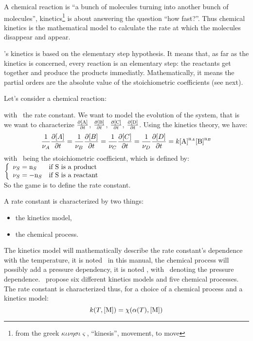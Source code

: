 A chemical reaction is ``a bunch of molecules
turning into another bunch of molecules'', kinetics\footnote{%
from the greek $\kappa\iota\nu\eta\sigma\iota\varsigma$, ``kinesis'', movement, to move}
is about answering the question ``how fast?''.
Thus chemical kinetics is the mathematical model
to calculate the rate at which the molecules disappear and
appear.

\antioch's kinetics is based on the elementary step
hypothesis. It means that, as far as the kinetics is
concerned, every reaction is an elementary step:
the reactants get together and produce the products
immediatly. Mathematically, it means
the partial orders are the absolute
value of the stoichiometric coefficients (see next).

Let's consider a chemical reaction:
\begin{chemicalEquation}
\label{genericX}
\end{chemicalEquation}
with \rcons\ the rate constant.
We want to model the evolution of the system, that is we want to
characterize 
$\doverdt{\conc[A]}$,
$\doverdt{\conc[B]}$,
$\doverdt{\conc[C]}$,
$\doverdt{\conc[D]}$.
Using the kinetics theory, we have:
\begin{equation}
\frac{1}{\scoef[A]}\doverdt{[A]} = 
\frac{1}{\scoef[B]}\doverdt{[B]} = 
\frac{1}{\scoef[C]}\doverdt{[C]} = 
\frac{1}{\scoef[D]}\doverdt{[D]} = 
\rcons\conc[A]^{\scoefabs[A]}\conc[B]^{\scoefabs[B]}
\end{equation}
with \scoef[A]\ being the stoichiometric coefficient, which is defined by:\\[5pt]
$\left\{\begin{array}{ll}
\scoef[S] = \scoefabs[S] & \text{if \ce{S} is a product} \\
\scoef[S] = -\scoefabs[S] & \text{if \ce{S} is a reactant} \\
\end{array}\right.$\\[5pt]
So the game is to define the rate constant. 

A rate constant is characterized by two things:
\begin{itemize}
\item the kinetics model,
\item the chemical process.
\end{itemize}
The kinetics model will mathematically describe the rate constant's dependence with
the temperature, it is noted \kinMod\ in this manual, the chemical process will
possibly add a pressure dependency, it is noted \chemProc, with \conc[M]\
denoting the pressure dependence.
\antioch\ propose six different kinetics models and five chemical processes.
The rate constant is characterized thus, for a choice of a chemical process and
a kinetics model:
\begin{equation}
\rateCons = \chemProc
\end{equation}
